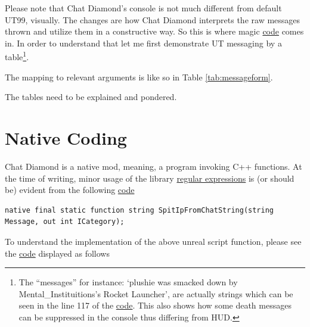 \documentclass{article}
\theoremstyle{definition}
\begin{document}
Please note that Chat Diamond's console is not much different from default UT99, visually.  The changes are how Chat Diamond interprets the raw messages thrown and utilize them in a constructive way. So this is where magic \href{https://github.com/ravimohan1991/ChatDiamond/blob/859323fbd80266b21c9dab163b067cacfa318463/Classes/CDUTConsole.uc#L52-L71}{code} comes in.  In order to understand that let me first demonstrate UT messaging by a table\footnote{\label{foot:hudconsolediff} The ``messages'' for instance: `plushie was smacked down by Mental\_Instituitions's Rocket Launcher', are actually strings which can be seen in the line 117 of the \href{http://uncodex.ut-files.com/UT/v436/Source_botpack/deathmessageplus.html}{code}.  This also shows how some death messages can be suppressed in the console thus differing from HUD.}.

The mapping to relevant arguments is like so in Table \ref{tab:messageform}.


The tables need to be explained and pondered.

\section{Native Coding}
Chat Diamond is a native mod, meaning, a program invoking C++ functions.  At the time of writing, minor usage of the library 
\href{https://en.cppreference.com/w/cpp/regex}{regular expressions} is (or should be) evident from the following \href{https://github.com/ravimohan1991/ChatDiamond/blob/6e3b684403fb75811c1cde6372c9125370bc796a/Classes/CDDiscordActor.uc#L61}{code}

\begin{lstlisting}[frame=single]
native final static function string SpitIpFromChatString(string Message, out int ICategory);
\end{lstlisting}

To understand the implementation of the above unreal script function, please see the \href{https://github.com/ravimohan1991/ChatDiamond/blob/6e3b684403fb75811c1cde6372c9125370bc796a/UTNativeEssentials/ChatDiamond/Src/ChatDiamondNative.cpp#L52}{code} displayed as follows
\end{document}
